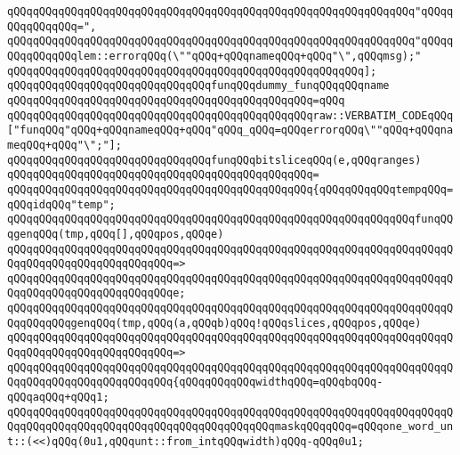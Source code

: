 \verb|qQQqqQQqqQQqqQQqqQQqqQQqqQQqqQQqqQQqqQQqqQQqqQQqqQQqqQQqqQQqqQQq"qQQqqQQqqQQqqQQq=",|\newline
\verb|qQQqqQQqqQQqqQQqqQQqqQQqqQQqqQQqqQQqqQQqqQQqqQQqqQQqqQQqqQQqqQQq"qQQqqQQqqQQqqQQqlem::errorqQQq(\""qQQq+qQQqnameqQQq+qQQq"\",qQQqmsg);"|\newline
\verb|qQQqqQQqqQQqqQQqqQQqqQQqqQQqqQQqqQQqqQQqqQQqqQQqqQQqqQQq];|\newline
\newline
\verb|qQQqqQQqqQQqqQQqqQQqqQQqqQQqqQQqfunqQQqdummy_funqQQqqQQqname|\newline
\verb|qQQqqQQqqQQqqQQqqQQqqQQqqQQqqQQqqQQqqQQqqQQqqQQq=qQQq|\newline
\verb|qQQqqQQqqQQqqQQqqQQqqQQqqQQqqQQqqQQqqQQqqQQqqQQqraw::VERBATIM_CODEqQQq["funqQQq"qQQq+qQQqnameqQQq+qQQq"qQQq_qQQq=qQQqerrorqQQq\""qQQq+qQQqnameqQQq+qQQq"\";"];|\newline
\newline
\newline
\verb|qQQqqQQqqQQqqQQqqQQqqQQqqQQqqQQqfunqQQqbitsliceqQQq(e,qQQqranges)|\newline
\verb|qQQqqQQqqQQqqQQqqQQqqQQqqQQqqQQqqQQqqQQqqQQqqQQq=|\newline
\verb|qQQqqQQqqQQqqQQqqQQqqQQqqQQqqQQqqQQqqQQqqQQqqQQq{qQQqqQQqqQQqtempqQQq=qQQqidqQQq"temp";|\newline
\newline
\verb|qQQqqQQqqQQqqQQqqQQqqQQqqQQqqQQqqQQqqQQqqQQqqQQqqQQqqQQqqQQqqQQqfunqQQqgenqQQq(tmp,qQQq[],qQQqpos,qQQqe)|\newline
\verb|qQQqqQQqqQQqqQQqqQQqqQQqqQQqqQQqqQQqqQQqqQQqqQQqqQQqqQQqqQQqqQQqqQQqqQQqqQQqqQQqqQQqqQQqqQQqqQQq=>|\newline
\verb|qQQqqQQqqQQqqQQqqQQqqQQqqQQqqQQqqQQqqQQqqQQqqQQqqQQqqQQqqQQqqQQqqQQqqQQqqQQqqQQqqQQqqQQqqQQqqQQqe;|\newline
\newline
\verb|qQQqqQQqqQQqqQQqqQQqqQQqqQQqqQQqqQQqqQQqqQQqqQQqqQQqqQQqqQQqqQQqqQQqqQQqqQQqqQQqgenqQQq(tmp,qQQq(a,qQQqb)qQQq!qQQqslices,qQQqpos,qQQqe)|\newline
\verb|qQQqqQQqqQQqqQQqqQQqqQQqqQQqqQQqqQQqqQQqqQQqqQQqqQQqqQQqqQQqqQQqqQQqqQQqqQQqqQQqqQQqqQQqqQQqqQQq=>|\newline
\verb|qQQqqQQqqQQqqQQqqQQqqQQqqQQqqQQqqQQqqQQqqQQqqQQqqQQqqQQqqQQqqQQqqQQqqQQqqQQqqQQqqQQqqQQqqQQqqQQq{qQQqqQQqqQQqwidthqQQq=qQQqbqQQq-qQQqaqQQq+qQQq1;|\newline
\verb|qQQqqQQqqQQqqQQqqQQqqQQqqQQqqQQqqQQqqQQqqQQqqQQqqQQqqQQqqQQqqQQqqQQqqQQqqQQqqQQqqQQqqQQqqQQqqQQqqQQqqQQqqQQqqQQqmaskqQQqqQQq=qQQqone_word_unt::(<<)qQQq(0u1,qQQqunt::from_intqQQqwidth)qQQq-qQQq0u1;|\newline
